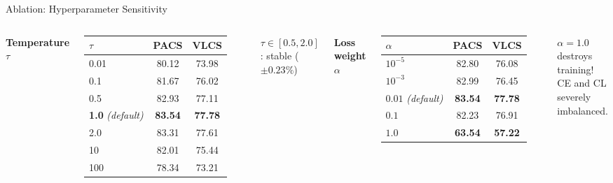 \documentclass[aspectratio=169,10pt]{beamer}
\newcommand{\highlight}[1]{\textcolor{AccentOrange}{\textbf{#1}}}
\newcommand{\good}[1]{\textcolor{GreenOK}{\textbf{#1}}}
\begin{document}
\begin{frame}{Ablation: Hyperparameter Sensitivity}
  \begin{columns}[T]
      \textbf{Temperature $\tau$}
      \vspace{0.2em}
      \small
      \begin{tabular}{@{}lcc@{}}
        \toprule
        $\tau$ & \textbf{PACS} & \textbf{VLCS} \\
        \midrule
        0.01   & 80.12 & 73.98 \\
        0.1    & 81.67 & 76.02 \\
        0.5    & 82.93 & 77.11 \\
        \good{1.0} \textit{(default)} & \good{83.54} & \good{77.78} \\
        2.0    & 83.31 & 77.61 \\
        10     & 82.01 & 75.44 \\
        100    & 78.34 & 73.21 \\
        \bottomrule
      \end{tabular}

      \vspace{0.3em}
      \begin{exampleblock}{\small $\tau \in [0.5,2.0]$: stable ($\pm 0.23\%$)}
      \end{exampleblock}

      \textbf{Loss weight $\alpha$}
      \vspace{0.2em}
      \small
      \begin{tabular}{@{}lcc@{}}
        \toprule
        $\alpha$ & \textbf{PACS} & \textbf{VLCS} \\
        \midrule
        $10^{-5}$ & 82.80 & 76.08 \\
        $10^{-3}$ & 82.99 & 76.45 \\
        \good{$0.01$} \textit{(default)} & \good{83.54} & \good{77.78} \\
        $0.1$     & 82.23 & 76.91 \\
        \highlight{$1.0$} & \highlight{63.54} & \highlight{57.22} \\
        \bottomrule
      \end{tabular}

      \vspace{0.3em}
      \begin{alertblock}{\small $\alpha=1.0$ destroys training!\\CE and CL severely imbalanced.}
      \end{alertblock}
  \end{columns}
\end{frame}
\end{document}
